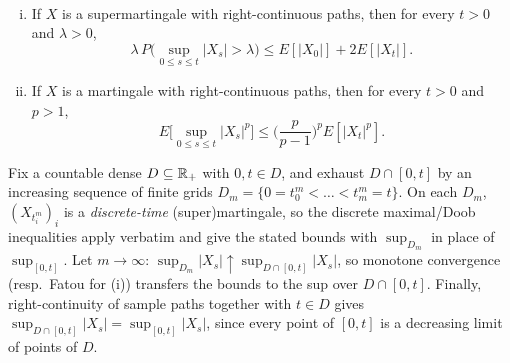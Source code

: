 \begin{proposition} \label{chap3.3:proposition-maximal_and_doob_Lp_inequality}  \\
\begin{enumerate}[(i)]
    \item If $X$ is a supermartingale with right-continuous paths, then for every $t>0$ and $\lambda>0$,
    $$\lambda\,P\Big(\sup_{0\le s\le t}|X_s|>\lambda\Big)\le E[|X_0|]+2E[|X_t|].$$
    \item If $X$ is a martingale with right-continuous paths, then for every $t>0$ and $p>1$,
    $$E\Big[\sup_{0\le s\le t}|X_s|^p\Big]\le\Big(\frac{p}{p-1}\Big)^pE[|X_t|^p].$$
\end{enumerate}
\end{proposition}
\begin{proofidea}
Fix a countable dense $D\subseteq\mathbb{R}_+$ with $0,t\in D$, and exhaust $D\cap[0,t]$ by an increasing sequence of finite grids $D_m=\{0=t_0^m<\dots<t_m^m=t\}$. On each $D_m$, $(X_{t_i^m})_i$ is a \emph{discrete-time} (super)martingale, so the discrete maximal/Doob inequalities apply verbatim and give the stated bounds with $\sup_{D_m}$ in place of $\sup_{[0,t]}$. Let $m\to\infty$: $\sup_{D_m}|X_s|\uparrow\sup_{D\cap[0,t]}|X_s|$, so monotone convergence (resp.\ Fatou for (i)) transfers the bounds to the sup over $D\cap[0,t]$. Finally, right-continuity of sample paths together with $t\in D$ gives $\sup_{D\cap[0,t]}|X_s|=\sup_{[0,t]}|X_s|$, since every point of $[0,t]$ is a decreasing limit of points of $D$.
\end{proofidea}


